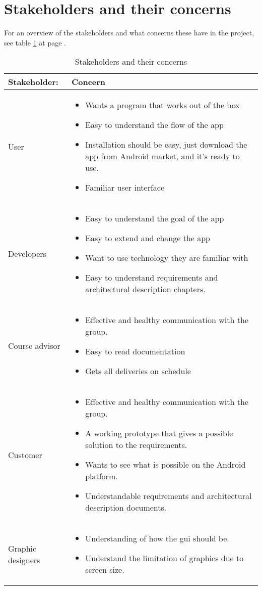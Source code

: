 \section{Stakeholders and their concerns}
For an overview of the stakeholders and what concerns these have in the project, see table \ref{tab:stakeholders} at page \pageref{tab:stakeholders}.

\begin{table}
\begin{tabular}{p{3.5cm}|p{11.5cm}} \hline
\textbf{Stakeholder:} & \textbf{Concern} \\ \hline \hline
User & 
\begin{itemize}
\item{} Wants a program that works out of the box
\item{} Easy to understand the flow of the app
\item{} Installation should be easy, just download the app from Android market, and it’s ready to use.
\item{} Familiar user interface
\end{itemize}\\ \hline
Developers & 
\begin{itemize}
\item{}Easy to understand the goal of the app
\item{}Easy to extend and change the app
\item{}Want to use technology they are familiar with
\item{}Easy to understand requirements and architectural description chapters.
\end{itemize}\\ \hline
Course advisor & 
\begin{itemize}
\item{}Effective and healthy communication with the group.
\item{}Easy to read documentation
\item{}Gets all deliveries on schedule
\end{itemize}\\ \hline
Customer & 
\begin{itemize}
\item{}Effective and healthy communication with the group.
\item{}A working prototype that gives a possible solution to the requirements.
\item{}Wants to see what is possible on the Android platform.
\item{}Understandable requirements and architectural description documents.
\end{itemize}\\ \hline
Graphic designers & 
\begin{itemize}
\item{}Understanding of how the \gls{gui} should be.
\item{}Understand the limitation of graphics due to screen size.
\end{itemize} \\ \hline
\end{tabular}
\caption{Stakeholders and their concerns} \label{tab:stakeholders}
\end{table}